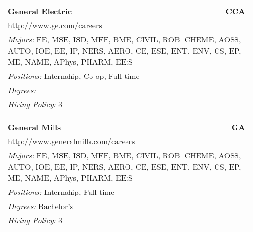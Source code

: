 \documentclass[twoside]{article}
\begin{document}
\begin{center}
\begin{multicols}{3}
\begin{FlushLeft}
\begin{minipage}{\columnwidth}\begin{tabularx}{.95\columnwidth}{Xr}
                 {\Large\bf General Electric} & {\Large\bf CCA}\\
    \multicolumn{2}{p{.95\columnwidth}}{\url{http://www.ge.com/careers}}\\
    \multicolumn{2}{p{.95\columnwidth}}{\emph{Majors:} FE, MSE, ISD, MFE, BME, CIVIL, ROB, CHEME, AOSS, AUTO, IOE, EE, IP, NERS, AERO, CE, ESE, ENT, ENV, CS, EP, ME, NAME, APhys, PHARM, EE:S}\\
    \multicolumn{2}{p{.95\columnwidth}}{\emph{Positions:} Internship, Co-op, Full-time}\\
    \multicolumn{2}{p{.95\columnwidth}}{\emph{Degrees:} }\\
    \multicolumn{2}{p{.95\columnwidth}}{\emph{Hiring Policy:} 3}\\
    \end{tabularx}
    
\end{minipage}
 
\begin{minipage}{\columnwidth}\begin{tabularx}{.95\columnwidth}{Xr}
                 {\Large\bf General Mills} & {\Large\bf GA}\\
    \multicolumn{2}{p{.95\columnwidth}}{\url{http://www.generalmills.com/careers}}\\
    \multicolumn{2}{p{.95\columnwidth}}{\emph{Majors:} FE, MSE, ISD, MFE, BME, CIVIL, ROB, CHEME, AOSS, AUTO, IOE, EE, IP, NERS, AERO, CE, ESE, ENT, ENV, CS, EP, ME, NAME, APhys, PHARM, EE:S}\\
    \multicolumn{2}{p{.95\columnwidth}}{\emph{Positions:} Internship, Full-time}\\
    \multicolumn{2}{p{.95\columnwidth}}{\emph{Degrees:} Bachelor's}\\
    \multicolumn{2}{p{.95\columnwidth}}{\emph{Hiring Policy:} 3}\\
    \end{tabularx}
    
\end{minipage}
 

\end{FlushLeft}
\end{multicols}
\end{center}
\end{document}
